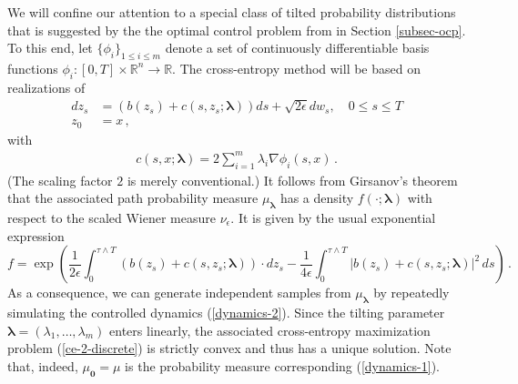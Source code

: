 \documentclass[final]{siamltex}
\newcommand{\eps}{\epsilon}
\newcommand{\blambda}{\bm{\lambda}}
\newcommand{\wrt}{with respect to }
\begin{document}
We will confine our attention to a special class of tilted probability distributions that is suggested by the 
the optimal control problem from in Section \ref{subsec-ocp}. To this end, let  
 $\{\phi_i\}_{1\le i \le m}$ denote a set of continuously differentiable basis functions $\phi_i\colon [0,T]\times \mathbb{R}^n\rightarrow \mathbb{R}$. 
 The cross-entropy method will be based on realizations of 
 \begin{equation}
\begin{aligned}
  d z_s &= \left(b(z_s) + c(s,z_{s};\blambda) \right)ds + \sqrt{2\eps } dw_s, \quad 0 \le s \le T \\
     z_0 &=x\,,
     \end{aligned}
\label{dynamics-2}
\end{equation}
with 
\begin{align}
  c(s,x;\blambda) = 2\sum_{i = 1}^{m} \lambda_i \nabla \phi_i(s,x)\,.
  \label{control-force}
\end{align}
(The scaling factor $2$ is merely conventional.) It follows from Girsanov's theorem that  
the associated path probability measure $\mu_{\blambda}$ has a density $f(\cdot;\blambda)$ \wrt the scaled Wiener measure $\nu_{\eps}$. It 
is given by the usual exponential expression
\begin{equation}\label{girsanov4}
  f= \exp\left(\frac{1}{2\eps}\int_0^{\tau\wedge T} (b(z_s)+c(s,z_{s};\blambda))\cdot dz_s 
  - \frac{1}{4\eps}\int_0^{\tau\wedge T} |b(z_s) + c(s,z_{s};\blambda)|^2\,ds\right) \,.
\end{equation}
As a consequence, we can generate independent samples from $\mu_{\blambda}$ by 
repeatedly simulating the controlled dynamics (\ref{dynamics-2}). Since the tilting parameter 
$\blambda=(\lambda_{1},\ldots,\lambda_{m})$ enters linearly, the associated 
cross-entropy maximization problem (\ref{ce-2-discrete}) is strictly convex and thus has a unique solution. 
Note that, indeed, $\mu_{\bm{0}} = \mu$ is the probability measure corresponding (\ref{dynamics-1}).
\end{document}
